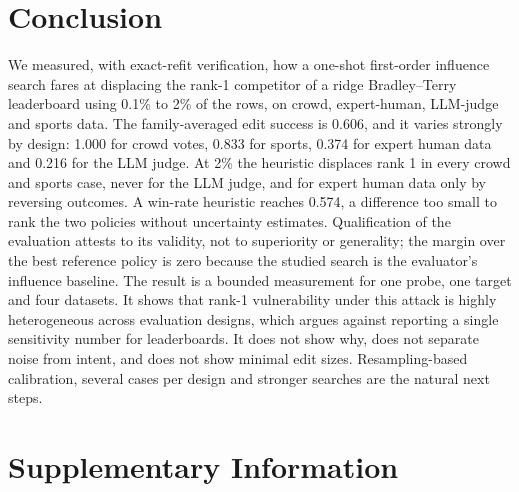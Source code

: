 \documentclass{article}
\begin{document}
\section{Conclusion}
We measured, with exact-refit verification, how a one-shot first-order influence search fares at displacing the rank-1 competitor of a ridge Bradley--Terry leaderboard using 0.1\% to 2\% of the rows, on crowd, expert-human, LLM-judge and sports data. The family-averaged edit success is 0.606, and it varies strongly by design: 1.000 for crowd votes, 0.833 for sports, 0.374 for expert human data and 0.216 for the LLM judge. At 2\% the heuristic displaces rank 1 in every crowd and sports case, never for the LLM judge, and for expert human data only by reversing outcomes. A win-rate heuristic reaches 0.574, a difference too small to rank the two policies without uncertainty estimates. Qualification of the evaluation attests to its validity, not to superiority or generality; the margin over the best reference policy is zero because the studied search is the evaluator's influence baseline.
The result is a bounded measurement for one probe, one target and four datasets. It shows that rank-1 vulnerability under this attack is highly heterogeneous across evaluation designs, which argues against reporting a single sensitivity number for leaderboards. It does not show why, does not separate noise from intent, and does not show minimal edit sizes. Resampling-based calibration, several cases per design and stronger searches are the natural next steps.

\clearpage



\clearpage
\appendix
\section{Supplementary Information}
\end{document}
